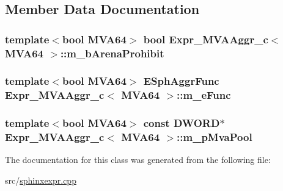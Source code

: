 \subsection{Member Data Documentation}
\hypertarget{classExpr__MVAAggr__c_aa627ac458abf03a80b9a29c004869b23}{
\subsubsection[{m\-\_\-b\-Arena\-Prohibit}]{\setlength{\rightskip}{0pt plus 5cm}template$<$bool M\-V\-A64$>$ bool {\bf Expr\-\_\-\-M\-V\-A\-Aggr\-\_\-c}$<$ M\-V\-A64 $>$\-::m\-\_\-b\-Arena\-Prohibit\hspace{0.3cm}{\ttfamily [protected]}}}\label{classExpr__MVAAggr__c_aa627ac458abf03a80b9a29c004869b23}
\hypertarget{classExpr__MVAAggr__c_a4b1db304df7400f5697429b7cb8fe330}{
\subsubsection[{m\-\_\-e\-Func}]{\setlength{\rightskip}{0pt plus 5cm}template$<$bool M\-V\-A64$>$ {\bf E\-Sph\-Aggr\-Func} {\bf Expr\-\_\-\-M\-V\-A\-Aggr\-\_\-c}$<$ M\-V\-A64 $>$\-::m\-\_\-e\-Func\hspace{0.3cm}{\ttfamily [protected]}}}\label{classExpr__MVAAggr__c_a4b1db304df7400f5697429b7cb8fe330}
\hypertarget{classExpr__MVAAggr__c_a928aea58ba316b1c727583886d6954bc}{
\subsubsection[{m\-\_\-p\-Mva\-Pool}]{\setlength{\rightskip}{0pt plus 5cm}template$<$bool M\-V\-A64$>$ const {\bf D\-W\-O\-R\-D}$\ast$ {\bf Expr\-\_\-\-M\-V\-A\-Aggr\-\_\-c}$<$ M\-V\-A64 $>$\-::m\-\_\-p\-Mva\-Pool\hspace{0.3cm}{\ttfamily [protected]}}}\label{classExpr__MVAAggr__c_a928aea58ba316b1c727583886d6954bc}


The documentation for this class was generated from the following file\-:\begin{DoxyCompactItemize}
\item 
src/\hyperlink{sphinxexpr_8cpp}{sphinxexpr.\-cpp}\end{DoxyCompactItemize}
